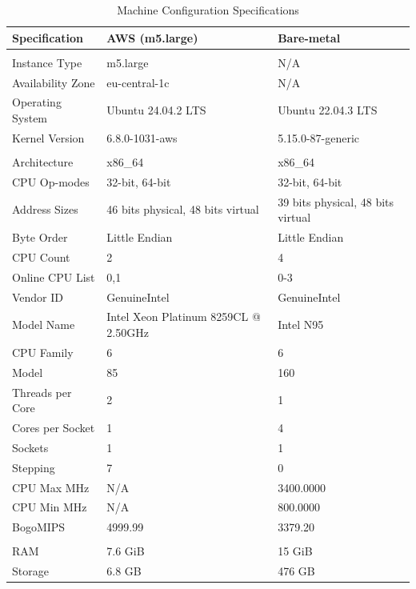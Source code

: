 \begin{table}[H]
\centering
\caption{Machine Configuration Specifications}
\label{tab:machine_config}
\begin{tabular}{>{\raggedright}p{3.5cm}p{5cm}p{5cm}}
\toprule
\textbf{Specification} & \textbf{AWS (m5.large)} & \textbf{Bare-metal} \\
\midrule
\multicolumn{3}{l}{\textbf{System Information}} \\
Instance Type & m5.large & N/A \\
Availability Zone & eu-central-1c & N/A \\
Operating System & Ubuntu 24.04.2 LTS & Ubuntu 22.04.3 LTS \\
Kernel Version & 6.8.0-1031-aws & 5.15.0-87-generic \\
\midrule
\multicolumn{3}{l}{\textbf{CPU Specifications}} \\
Architecture & x86\_64 & x86\_64 \\
CPU Op-modes & 32-bit, 64-bit & 32-bit, 64-bit \\
Address Sizes & 46 bits physical, 48 bits virtual & 39 bits physical, 48 bits virtual \\
Byte Order & Little Endian & Little Endian \\
CPU Count & 2 & 4 \\
Online CPU List & 0,1 & 0-3 \\
Vendor ID & GenuineIntel & GenuineIntel \\
Model Name & Intel Xeon Platinum 8259CL @ 2.50GHz & Intel N95 \\
CPU Family & 6 & 6 \\
Model & 85 & 160 \\
Threads per Core & 2 & 1 \\
Cores per Socket & 1 & 4 \\
Sockets & 1 & 1 \\
Stepping & 7 & 0 \\
CPU Max MHz & N/A & 3400.0000 \\
CPU Min MHz & N/A & 800.0000 \\
BogoMIPS & 4999.99 & 3379.20 \\
\midrule
\multicolumn{3}{l}{\textbf{Memory \& Storage}} \\
RAM & 7.6 GiB & 15 GiB \\
Storage & 6.8 GB & 476 GB \\
\bottomrule
\end{tabular}
\end{table}


